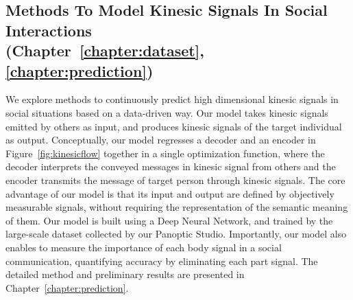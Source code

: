 \subsection{Methods To Model Kinesic Signals In Social Interactions\\ (Chapter~\ref{chapter:dataset}, \ref{chapter:prediction})  }
 We explore methods to continuously predict high dimensional kinesic signals in social situations based on a data-driven way. Our model takes kinesic signals emitted by others as input, and produces kinesic signals of the target individual as output. Conceptually, our model regresses a decoder and an encoder in Figure~\ref{fig:kinesicflow} together in a single optimization function, where the decoder interprets the conveyed messages in kinesic signal from others and the encoder transmits the message of target person through kinesic signals. The core advantage of our model is that its input and output are defined by objectively measurable signals, without requiring the representation of the semantic meaning of them. Our model is built using a Deep Neural Network, and trained by the large-scale dataset collected by our Panoptic Studio. Importantly, our model also enables to measure the importance of each body signal in a social communication, quantifying accuracy by eliminating each part signal. The detailed method and preliminary results are presented in Chapter~\ref{chapter:prediction}.




